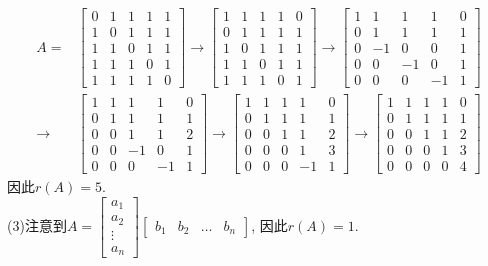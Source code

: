 \documentclass[a4paper]{book}
\begin{document}
\begin{displaymath}
\begin{aligned}A=&\left[\begin{array}{ccccc}0&1&1&1&1\\1&0&1&1&1\\1&1&0&1&1\\ 1&1&1&0&1\\1&1&1&1&0\end{array}\right]\rightarrow
\left[\begin{array}{ccccc}1&1&1&1&0 \\0&1&1&1&1\\1&0&1&1&1\\1&1&0&1&1\\ 1&1&1&0&1\end{array}\right]
\rightarrow \left[\begin{array}{ccccc}1&1&1&1&0 \\0&1&1&1&1\\0&-1&0&0&1\\0&0&-1&0&1\\ 0&0&0&-1&1\end{array}\right]\\
\rightarrow &\left[\begin{array}{ccccc}1&1&1&1&0 \\0&1&1&1&1\\0&0&1&1&2\\0&0&-1&0&1\\ 0&0&0&-1&1\end{array}\right]
\rightarrow \left[\begin{array}{ccccc}1&1&1&1&0 \\0&1&1&1&1\\0&0&1&1&2\\0&0&0&1&3\\ 0&0&0&-1&1\end{array}\right]
\rightarrow \left[\begin{array}{ccccc}1&1&1&1&0 \\0&1&1&1&1\\0&0&1&1&2\\0&0&0&1&3\\ 0&0&0&0&4\end{array}\right] \end{aligned}\end{displaymath}
因此$r(A)=5$.\\
(3)注意到$A=\begin{bmatrix}a_1\\a_2\\ \vdots\\a_n\end{bmatrix}\begin{bmatrix}b_1&b_2&\dots&b_n\end{bmatrix}$, 因此$r(A)=1$.
\end{document}
